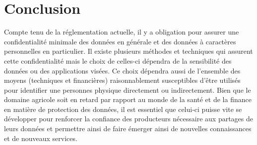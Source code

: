 \chapter{Conclusion}
Compte tenu de la réglementation actuelle, il y a obligation pour assurer une  confidentialité minimale  des données en générale et des données à caractères personnelles en particulier. Il existe plusieurs méthodes et techniques qui assurent cette confidentialité mais le choix de celles-ci dépendra de la sensibilité des données ou des applications visées. Ce choix dépendra aussi de l'ensemble des moyens (techniques et financières) raisonnablement susceptibles d'être utilisés pour identifier une personnes physique directement ou indirectement. Bien que le domaine agricole soit en retard par rapport au monde de la santé et de la finance en matière de protection des données, il est essentiel que celui-ci puisse vite se développer pour renforcer la confiance des producteurs nécessaire aux partages de leurs données et permettre ainsi de faire émerger ainsi de nouvelles connaissances et de nouveaux services.